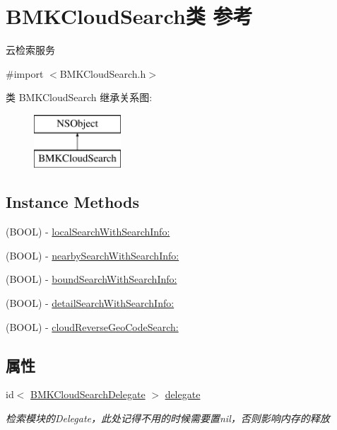 \hypertarget{interface_b_m_k_cloud_search}{}\section{B\+M\+K\+Cloud\+Search类 参考}
\label{interface_b_m_k_cloud_search}


云检索服务  




{\ttfamily \#import $<$B\+M\+K\+Cloud\+Search.\+h$>$}

类 B\+M\+K\+Cloud\+Search 继承关系图\+:\begin{figure}[H]
\begin{center}
\leavevmode
\includegraphics[height=2.000000cm]{interface_b_m_k_cloud_search}
\end{center}
\end{figure}
\subsection*{Instance Methods}
\begin{DoxyCompactItemize}
\item 
(B\+O\+O\+L) -\/ \hyperlink{interface_b_m_k_cloud_search_a473c4aeff275be5840ac6cf8010ce1d8}{local\+Search\+With\+Search\+Info\+:}
\item 
(B\+O\+O\+L) -\/ \hyperlink{interface_b_m_k_cloud_search_abe65e1b2f2b67e1d081c697caae80e4b}{nearby\+Search\+With\+Search\+Info\+:}
\item 
(B\+O\+O\+L) -\/ \hyperlink{interface_b_m_k_cloud_search_a7b2a5b409e884fb240e94f42cbad5208}{bound\+Search\+With\+Search\+Info\+:}
\item 
(B\+O\+O\+L) -\/ \hyperlink{interface_b_m_k_cloud_search_aaa7dcb1e49edd705290a3e79d8d22e92}{detail\+Search\+With\+Search\+Info\+:}
\item 
(B\+O\+O\+L) -\/ \hyperlink{interface_b_m_k_cloud_search_a8098d07537ac47499e9383bc9e423828}{cloud\+Reverse\+Geo\+Code\+Search\+:}
\end{DoxyCompactItemize}
\subsection*{属性}
\begin{DoxyCompactItemize}
\item 
\hypertarget{interface_b_m_k_cloud_search_ac35ac10ba735ab371814e2d69c27af23}{}id$<$ \hyperlink{protocol_b_m_k_cloud_search_delegate-p}{B\+M\+K\+Cloud\+Search\+Delegate} $>$ \hyperlink{interface_b_m_k_cloud_search_ac35ac10ba735ab371814e2d69c27af23}{delegate}\label{interface_b_m_k_cloud_search_ac35ac10ba735ab371814e2d69c27af23}

\begin{DoxyCompactList}\small\item\em 检索模块的\+Delegate，此处记得不用的时候需要置nil，否则影响内存的释放 \end{DoxyCompactList}\end{DoxyCompactItemize}


